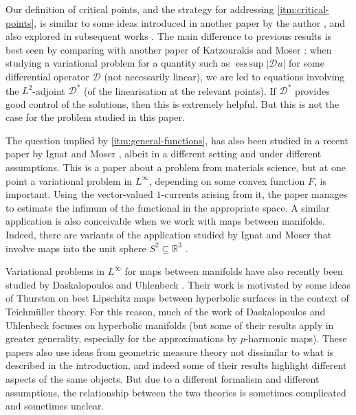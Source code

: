 \documentclass[a4paper]{article}
\newcommand{\R}{\mathbb{R}}
\DeclareMathOperator*{\esssup}{ess \, sup}
\theoremstyle{definition}
\theoremstyle{remark}
\begin{document}
Our definition of critical points, and the strategy for addressing \ref{itm:critical-points},
is similar to some ideas introduced in another paper by the author \cite{Moser:22}, and also
explored in subsequent works \cite{Katzourakis-Moser:23, Gallagher-Moser:23, Gallagher-Moser:24}.
The main difference to previous results is best seen by comparing with
another paper of Katzourakis and Moser
\cite{Katzourakis-Moser:23}: when studying a variational problem for a quantity such as $\esssup |\mathcal{D} u|$
for some differential operator $\mathcal{D}$ (not necessarily linear), we are led to equations involving the $L^2$-adjoint
$\mathcal{D}^*$ (of the linearisation at the relevant points). If $\mathcal{D}^*$ provides good control of
the solutions, then this is extremely helpful. But this is not the case for the problem studied in this paper.

The question implied by \ref{itm:general-functions}, has also been studied in a recent paper by Ignat and Moser
\cite{Ignat-Moser:25}, albeit in a different setting and under different assumptions.
This is a paper about a problem from materials science, but at one
point a variational problem in $L^\infty$, depending on some convex function $F$, is important.
Using the vector-valued $1$-currents arising from it, the paper manages to estimate the
infimum of the functional in the appropriate space. A similar application is also conceivable
when we work with maps between manifolds. Indeed, there are variants of the application
studied by Ignat and Moser that involve maps into the unit sphere $S^2 \subseteq \R^3$ \cite{Ignat-Merlet:11}.

Variational problems in $L^\infty$ for maps between manifolds have also recently been studied by
Daskalopoulos and Uhlenbeck \cite{Daskalopoulos-Uhlenbeck:24, Daskalopoulos-Uhlenbeck:22, Daskalopoulos-Uhlenbeck:24.2}.
Their work is motivated by some ideas of Thurston \cite{Thurston:98} on best Lipschitz maps
between hyperbolic surfaces in the context of Teichm\"uller theory.
For this reason, much of the work of Daskalopoulos and Uhlenbeck focuses on hyperbolic
manifolds (but some of their results apply in greater generality, especially for the
approximations by $p$-harmonic maps). These papers also use ideas from
geometric measure theory not dissimilar to what is described in the introduction, and indeed
some of their results highlight different aspects of the same objects. But due to a
different formalism and different assumptions, the relationship between the
two theories is sometimes complicated and sometimes unclear.
\end{document}
